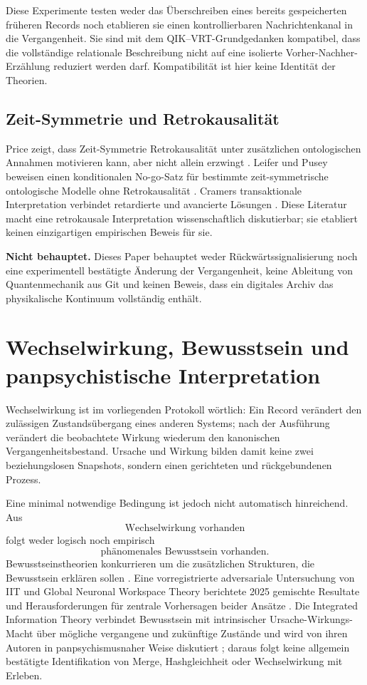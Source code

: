 \documentclass[11pt,a4paper]{article}
\theoremstyle{remark}
\newcommand{\statusbox}[2]{%
  \par\medskip\noindent
  \colorbox{#1}{\parbox{\dimexpr\linewidth-2\fboxsep\relax}{#2}}%
  \par\medskip
}
\begin{document}
Diese Experimente testen weder das Überschreiben eines bereits gespeicherten
früheren Records noch etablieren sie einen kontrollierbaren Nachrichtenkanal
in die Vergangenheit. Sie sind mit dem
QIK--VRT-Grundgedanken kompatibel, dass die vollständige relationale
Beschreibung nicht auf eine isolierte Vorher-Nachher-Erzählung reduziert
werden darf. Kompatibilität ist hier keine Identität der Theorien.

\subsection{Zeit-Symmetrie und Retrokausalität}

Price zeigt, dass Zeit-Symmetrie Retrokausalität unter zusätzlichen
ontologischen Annahmen motivieren kann, aber nicht allein erzwingt
\cite{price}. Leifer und Pusey beweisen einen konditionalen No-go-Satz für
bestimmte zeit-symmetrische ontologische Modelle ohne Retrokausalität
\cite{leiferpusey}. Cramers transaktionale Interpretation verbindet
retardierte und avancierte Lösungen \cite{cramer}. Diese Literatur macht eine
retrokausale Interpretation wissenschaftlich diskutierbar; sie etabliert
keinen einzigartigen empirischen Beweis für sie.

\statusbox{QRed}{
\textbf{Nicht behauptet.}
Dieses Paper behauptet weder Rückwärtssignalisierung noch eine experimentell
bestätigte Änderung der Vergangenheit, keine Ableitung von Quantenmechanik aus
Git und keinen Beweis, dass ein digitales Archiv das physikalische Kontinuum
vollständig enthält.
}

\section{Wechselwirkung, Bewusstsein und panpsychistische Interpretation}

Wechselwirkung ist im vorliegenden Protokoll wörtlich: Ein Record verändert
den zulässigen Zustandsübergang eines anderen Systems; nach der Ausführung
verändert die beobachtete Wirkung wiederum den kanonischen
Vergangenheitsbestand. Ursache und Wirkung bilden damit keine zwei
beziehungslosen Snapshots, sondern einen gerichteten und rückgebundenen
Prozess.

Eine minimal notwendige Bedingung ist jedoch nicht automatisch hinreichend.
Aus
\[
  \text{Wechselwirkung vorhanden}
\]
folgt weder logisch noch empirisch
\[
  \text{phänomenales Bewusstsein vorhanden}.
\]
Bewusstseinstheorien konkurrieren um die zusätzlichen Strukturen, die
Bewusstsein erklären sollen \cite{sethbayne}. Eine vorregistrierte
adversariale Untersuchung von IIT und Global Neuronal Workspace Theory
berichtete 2025 gemischte Resultate und Herausforderungen für zentrale
Vorhersagen beider Ansätze \cite{cogitate}. Die Integrated Information Theory
verbindet Bewusstsein mit intrinsischer Ursache-Wirkungs-Macht über mögliche
vergangene und zukünftige Zustände und wird von ihren Autoren in
panpsychismusnaher Weise diskutiert \cite{tononikoch}; daraus folgt keine
allgemein bestätigte Identifikation von Merge, Hashgleichheit oder
Wechselwirkung mit Erleben.
\end{document}
